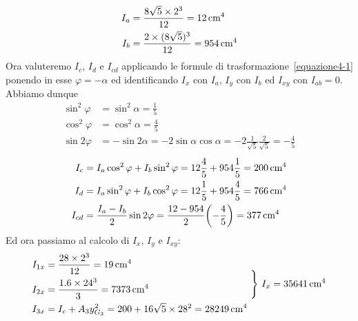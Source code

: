 \begin{align*}
I_a &= \frac{8\sqrt{5}\times2^{3}}{12} = 12\,\textup{cm}^4 \\
I_b &= \frac{2\times(8\sqrt{5})^{3}}{12} = 954\,\textup{cm}^4
\end{align*}
Ora valuteremo $I_c$, $I_d$ e $I_{cd}$ applicando le formule di trasformazione~\eqref{equazione4-1} ponendo in esse $\varphi=-\alpha$ ed identificando $I_x$ con $I_a$, $I_y$ con $I_b$ ed $I_{xy}$ con $I_{ab}=0$. Abbiamo dunque 
\begin{align*}
\sin^{2}\varphi &= \sin^{2}\alpha = \frac{1}{5} \\
\cos^{2}\varphi &= \cos^{2}\alpha = \frac{4}{5} \\ 
\sin2\varphi &= -\sin2\alpha = -2\sin\alpha\cos\alpha = -2\frac{1}{\sqrt{5}}\frac{2}{\sqrt{5}} = -\frac{4}{5}
\end{align*}
\begin{align*}
I_c &= I_{a}\cos^{2}\varphi+I_{b}\sin^{2}\varphi = 12\frac{4}{5}+954\frac{1}{5} = 200\,\textup{cm}^4 \\
I_d &= I_{a}\sin^{2}\varphi+I_{b}\cos^{2}\varphi = 12\frac{1}{5}+954\frac{4}{5} = 766\,\textup{cm}^4 \\
I_{cd} &= \frac{I_{a}-I_{b}}{2}\sin2\varphi = \frac{12-954}{2}\biggl(-\frac{4}{5}\biggr) = 377\,\textup{cm}^4
\end{align*}
Ed ora passiamo al calcolo di $I_x$, $I_y$ e $I_{xy}$:
\begin{equation*}
\begin{aligned}
I_{1x} &= \frac{28\times2^{3}}{12} = 19\,\textup{cm}^4 \\
I_{2x} &= \frac{1.6\times24^{3}}{3} = 7373\,\textup{cm}^4 \\
I_{3x} &= I_c+A_{3}y_{G_3}^{2} = 200+16\sqrt{5}\times28^2 = 28249\,\textup{cm}^4 
\end{aligned}
\,\,\Biggr\}\,\, I_x = 35641\,\textup{cm}^4
\end{equation*}
